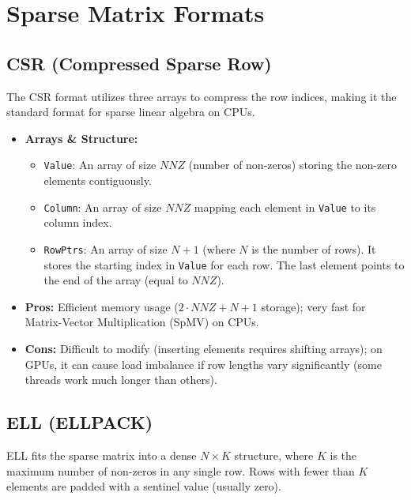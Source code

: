 \documentclass[a4paper,12pt]{article}
\begin{document}
\section{Sparse Matrix Formats}

\subsection{CSR (Compressed Sparse Row)}
The CSR format utilizes three arrays to compress the row indices, making it the standard format for sparse linear algebra on CPUs.

\begin{itemize}
    \item \textbf{Arrays \& Structure:}
    \begin{itemize}
        \item \texttt{Value}: An array of size $NNZ$ (number of non-zeros) storing the non-zero elements contiguously.
        \item \texttt{Column}: An array of size $NNZ$ mapping each element in \texttt{Value} to its column index.
        \item \texttt{RowPtrs}: An array of size $N + 1$ (where $N$ is the number of rows). It stores the starting index in \texttt{Value} for each row. The last element points to the end of the array (equal to $NNZ$).
    \end{itemize}
    
    \item \textbf{Pros:} Efficient memory usage ($2 \cdot NNZ + N + 1$ storage); very fast for Matrix-Vector Multiplication (SpMV) on CPUs.
    \item \textbf{Cons:} Difficult to modify (inserting elements requires shifting arrays); on GPUs, it can cause load imbalance if row lengths vary significantly (some threads work much longer than others).
\end{itemize}



\subsection{ELL (ELLPACK)}
ELL fits the sparse matrix into a dense $N \times K$ structure, where $K$ is the maximum number of non-zeros in any single row. Rows with fewer than $K$ elements are padded with a sentinel value (usually zero).
\end{document}
